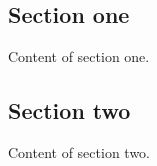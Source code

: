 \documentclass[UTF8,a4paper,10pt]{ctexart}
\begin{document}
  \title{\chapterTitle}
  \author{fanhongtao@163.com}
  \date{\today}
  \maketitle
  \pagebreak
  \tableofcontents
  \pagebreak
\else
  \chapter{\chapterTitle}
\fi

\section{Section one}

Content of section one.

\section{Section two}

Content of section two.

\ifx\allfiles\undefined
  
\end{document}
